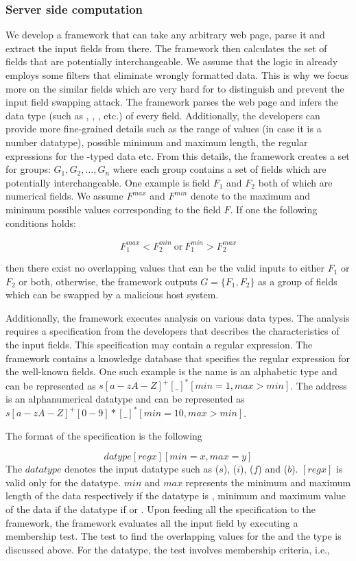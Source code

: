 \subsubsection{Server side computation}

 We develop a framework that can take any arbitrary web page, parse it and extract the input fields from there. The framework then calculates the set of fields that are potentially interchangeable. We assume that the logic in \server already employs some filters that eliminate wrongly formatted data. This is why we focus more on the similar fields which are very hard for \server to distinguish and prevent the input field swapping attack. The framework parses the web page and infers the data type (such as \integer, \float, \String, \boolean etc.) of every field. Additionally, the developers can provide more fine-grained details such as the range of values (in case it is a number datatype), possible minimum and maximum length, the regular expressions for the \String-typed data etc. From this details, the framework creates a set for groups: $G_1, G_2, \ldots, G_n$ where each group contains a set of fields which are potentially interchangeable. One example is field $F_1$ and $F_2$ both of which are numerical fields. We assume $F^{max}$ and $F^{min}$ denote to the maximum and minimum possible values corresponding to the field $F$. If one the following conditions holds:
 
$$F_1^{max} < F_2^{min} \ \text{or}\ F_1^{min} > F_2^{max}$$ 

then there exist no overlapping values that can be the valid inputs to either $F_1$ or $F_2$ or both, otherwise, the framework outputs $G=\{F_1, F_2\}$ as a group of fields which can be swapped by a malicious host system.

Additionally, the framework executes analysis on various data types. The analysis requires a specification from the developers that describes the characteristics of the input fields. This specification may contain a \String regular expression. The framework contains a knowledge database that specifies the regular expression for the well-known fields. One such example is the name is an alphabetic type and can be represented as $s[a-zA-Z]^+[\_]^*[min=1, max>min]$. The address is an alphanumerical \String datatype and can be represented as $s[a-zA-Z]^+[0-9]*[\_]^*[min=10, max>min]$. 

The format of the specification is the following

$$datype[regx][min = x, max = y]$$
The $datatype$ denotes the input datatype such as \String($s$), \integer($i$), \float($f$) and \boolean ($b$). $[regx]$ is valid only for the \String datatype. $min$ and $max$ represents the minimum and maximum length of the data respectively if the datatype is \String, minimum and maximum value of the data if the datatype if \integer or \float. Upon feeding all the specification to the framework, the framework evaluates all the input field by executing a membership test. The test to find the overlapping values for the \integer and the \float type is discussed above. For the \String datatype, the test involves membership criteria, i.e.,

